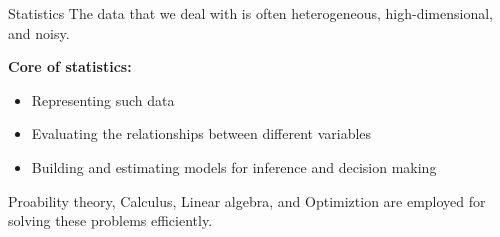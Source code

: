 \documentclass[aspectratio=169]{beamer}
\let\olditem\item
\renewcommand{\item}{\setlength{\itemsep}{\fill}\olditem}
\def\mf{\ensuremath\mathbf}
\def\lp{\ensuremath\left(}
\def\rp{\ensuremath\right)}
\newcommand{\ct}[1]{\lp #1\rp}
\begin{document}
      


\begin{frame}{Statistics}
  The data that we deal with is often heterogeneous, high-dimensional, and noisy.
  \vspace{1cm}
  
  \textbf{Core of statistics:}
  \begin{itemize}
    \item Representing such data
    \item Evaluating the relationships between different variables
    \item Building and estimating models for inference and decision making
  \end{itemize}
  \vspace{1cm}
  
  Proability theory, Calculus, Linear algebra, and Optimiztion are employed for solving these problems efficiently.
\end{frame}
\end{document}
